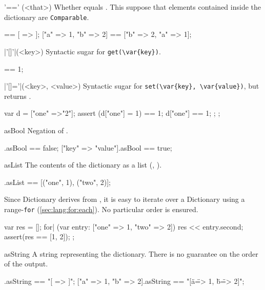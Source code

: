 \begin{urbiscriptapi}
\item['=='](<that>)%
  Whether \this equals .  This suppose that elements
  contained inside the dictionary are \lstinline|Comparable|.
\begin{urbiassert}
[ => ] == [ => ];
["a" => 1, "b" => 2] == ["b" => 2, "a" => 1];
\end{urbiassert}


\item|'[]'|(<key>)
  Syntactic sugar for \lstinline|get(\var{key})|.

\begin{urbiassert}
["one" => 1]["one"] == 1;
\end{urbiassert}


\item|'[]='|(<key>, <value>)%
  Syntactic sugar for \lstinline|set(\var{key}, \var{value})|, but returns
  .

\begin{urbiscript}
{
  var d = ["one" =>"2"];
  assert
  {
    (d["one"] = 1) == 1;
    d["one"] == 1;
  };
};
\end{urbiscript}


\item[asBool]
  Negation of .
\begin{urbiassert}
[=>].asBool == false;
["key" => "value"].asBool == true;
\end{urbiassert}


\item[asList]%
  The contents of the dictionary as a  list (,
  ).

\begin{urbiassert}
["one" => 1, "two" => 2].asList == [("one", 1), ("two", 2)];
\end{urbiassert}

  \noindent
  Since Dictionary derives from , it is easy
  to iterate over a Dictionary using a range-\lstinline|for|
  (\autoref{sec:lang:for:each}).  No particular order is ensured.
\begin{urbiscript}
{
  var res = [];
  for| (var entry: ["one" => 1, "two" => 2])
    res << entry.second;
  assert(res == [1, 2]);
};
\end{urbiscript}


\item[asString] A string representing the dictionary.  There is no guarantee
  on the order of the output.
\begin{urbiassert}
                [=>].asString == "[ => ]";
["a" => 1, "b" => 2].asString == "[\"a\" => 1, \"b\" => 2]";
\end{urbiassert}


\end{urbiscriptapi}
